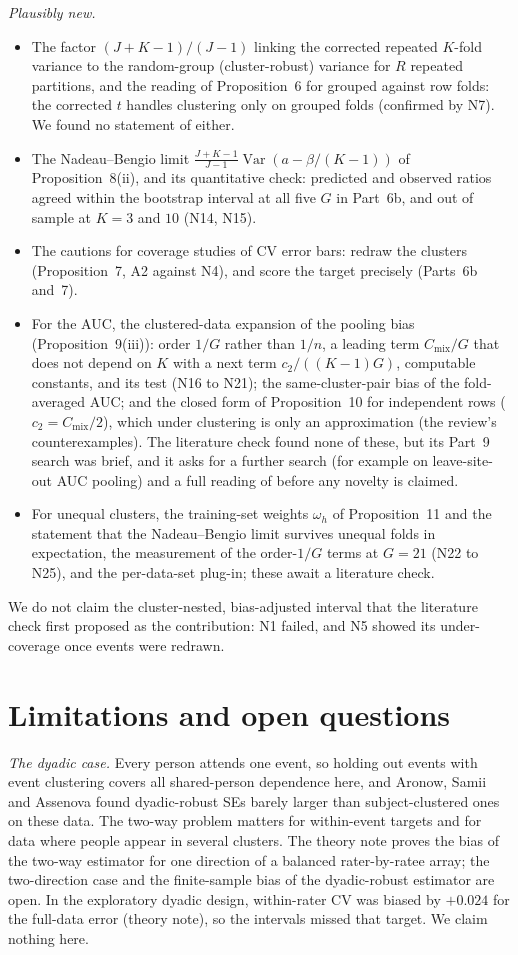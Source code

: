 \documentclass[11pt]{amsart}
\theoremstyle{plain}
\theoremstyle{definition}
\theoremstyle{remark}
\newcommand{\Var}{\operatorname{Var}}
\newcommand{\fac}{\tfrac{J+K-1}{J-1}}
\newcommand{\Cmix}{C_{\mathrm{mix}}}
\begin{document}
\emph{Plausibly new.}
\begin{itemize}
\item The factor $(J+K-1)/(J-1)$ linking the corrected repeated $K$-fold variance to the random-group (cluster-robust) variance for $R$ repeated partitions, and the reading of Proposition~6 for grouped against row folds: the corrected $t$ handles clustering only on grouped folds (confirmed by N7). We found no statement of either.
\item The Nadeau--Bengio limit $\fac\Var(a-\beta/(K-1))$ of Proposition~8(ii), and its quantitative check: predicted and observed ratios agreed within the bootstrap interval at all five $G$ in Part~6b, and out of sample at $K=3$ and $10$ (N14, N15).
\item The cautions for coverage studies of CV error bars: redraw the clusters (Proposition~7, A2 against N4), and score the target precisely (Parts~6b and~7).
\item For the AUC, the clustered-data expansion of the pooling bias (Proposition~9(iii)): order $1/G$ rather than $1/n$, a leading term $\Cmix/G$ that does not depend on $K$ with a next term $c_2/((K-1)G)$, computable constants, and its test (N16 to N21); the same-cluster-pair bias of the fold-averaged AUC; and the closed form of Proposition~10 for independent rows ($c_2=\Cmix/2$), which under clustering is only an approximation (the review's counterexamples). The literature check found none of these, but its Part~9 search was brief, and it asks for a further search (for example on leave-site-out AUC pooling) and a full reading of \cite{Airola2019} before any novelty is claimed.
\item For unequal clusters, the training-set weights $\omega_h$ of Proposition~11 and the statement that the Nadeau--Bengio limit survives unequal folds in expectation, the measurement of the order-$1/G$ terms at $G=21$ (N22 to N25), and the per-data-set plug-in; these await a literature check.
\end{itemize}
We do not claim the cluster-nested, bias-adjusted interval that the literature check first proposed as the contribution: N1 failed, and N5 showed its under-coverage once events were redrawn.

\section{Limitations and open questions}\label{sec:lim}

\emph{The dyadic case.} Every person attends one event, so holding out events with event clustering covers all shared-person dependence here, and Aronow, Samii and Assenova \cite{ASA} found dyadic-robust SEs barely larger than subject-clustered ones on these data. The two-way problem matters for within-event targets and for data where people appear in several clusters. The theory note proves the bias of the two-way estimator \cite{CGM} for one direction of a balanced rater-by-ratee array; the two-direction case and the finite-sample bias of the dyadic-robust estimator \cite{FG,ASA} are open. In the exploratory dyadic design, within-rater CV was biased by $+0.024$ for the full-data error (theory note), so the intervals missed that target. We claim nothing here.
\end{document}
